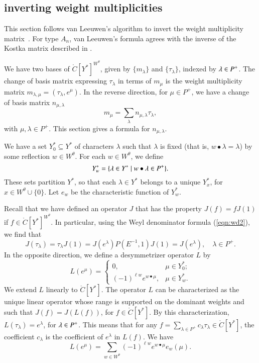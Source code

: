 \subsection{inverting weight multiplicities}

This section follows  van Leeuwen's algorithm to invert the weight multiplicity
matrix~\cite{vanleeuwen}.  
For type $A_n$, van Leeuwen's formula agrees with the inverse of the Kostka
matrix described in \cite{duan}.

We have two bases of $\ring{C}[Y^*]^{W^\theta}$, given by $\{m_\lambda\}$ and $\{\tau_\lambda\}$, indexed
by $\lambda\in P^+$.  
The change of basis matrix expressing $\tau_\lambda$ in terms of $m_\mu$ is the weight multiplicity
matrix $m_{\lambda,\mu} = (\tau_\lambda,e^\mu)$.  
In the reverse direction, for $\mu\in P^+$,
we have a change of basis matrix $n_{\mu,\lambda}$ 
\begin{equation}\label{eqn:n}
m_\mu = \sum_{\lambda} n_{\mu,\lambda} \tau_\lambda,
\end{equation}
with $\mu,\lambda\in P^+$.
This section gives a formula for $n_{\mu,\lambda}$.  

We have a set $Y^*_0\subseteq Y^*$ of characters $\lambda$ such that $\lambda$ is fixed 
(that is, $w\bullet \lambda = \lambda$) by some
reflection  $w\in W^\theta$.  For each $w\in W^\theta$, we define
\begin{equation}
Y^*_w = \{\lambda\in Y^*\mid w\bullet \lambda \in P^+\}.
\end{equation}
These sets partition $Y^*$, so that each $\lambda\in Y^*$ belongs to a unique $Y^*_x$, for $x\in W^\theta\cup\{0\}$.
Let $e_w$ be the characteristic function of $Y^*_w$.

Recall that we have defined an operator
$J$ that has the property $J(f) = f J(1)$ if $f\in \ring{C}[Y^*]^{W^\theta}$.
In particular, using the Weyl denominator formula (\ref{eqn:wd2}), we find that
\begin{equation}
 J(\tau_\lambda) = \tau_\lambda J(1) = J(e^\lambda) P(E^{-1},1) J(1) = J(e^\lambda),\quad  \lambda\in P^+.
\end{equation}
In the opposite direction, we define a desymmetrizer operator $L$ by
\[
L(e^\mu) = \begin{cases}
0,& \mu\in Y^*_0;\\
(-1)^{\ell{w}} e^{w\bullet \mu},& \mu\in Y^*_w.
\end{cases}
\]
We extend $L$ linearly to $\ring{C}[Y^*]$.
The operator $L$ can be characterized as the unique linear operator whose range is supported on
the dominant weights and such that $J(f) = J(L(f))$, for $f\in \ring{C}[Y^*]$.
By this characterization, $L(\tau_\lambda) = e^\lambda$, for $\lambda\in P^+$.  This means that
for any $f = \sum_{\lambda\in P^+} c_\lambda \tau_\lambda \in \ring{C}[Y^*]$, the coefficient $c_\lambda$
is the coefficient of $e^\lambda$ in $L(f)$.  We have 
\[
L(e^\mu) = \sum_{w\in W^\theta} (-1)^{\ell w} e^{w\bullet \mu} e_w(\mu).
\]

